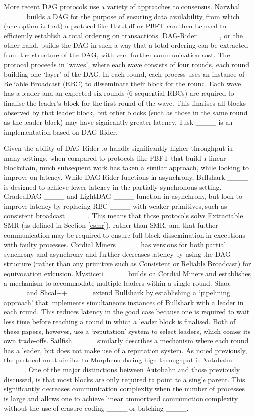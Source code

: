  \vspace{0.2cm}
 More recent DAG protocols use a variety of approaches to consensus. Narwhal ____ builds a DAG for the purpose of ensuring data availability, from which (one option is that) a protocol like Hotstuff or PBFT can then be used to efficiently establish a total ordering on transactions. DAG-Rider ____, on the other hand, builds the DAG in such a way that a total ordering can be extracted from the structure of the DAG, with zero further communication cost. The protocol proceeds in `waves', where each wave consists of four rounds, each round building one `layer' of the DAG. In each round, each process uses an instance of Reliable Broadcast (RBC) to disseminate their block for the round. Each wave has a leader and an 
 expected six rounds (6 sequential RBCs) are required to finalise
the leader's block for the first round of the wave. This finalises all blocks observed by that leader block, but other blocks (such as those in the same round as the leader block) may have signicantly greater latency. Tusk ____ is an implementation based on DAG-Rider. 

 \vspace{0.2cm} 
 Given the ability of DAG-Rider to handle significantly higher throughput in many settings, when compared to protocols like PBFT that build a linear blockchain, much subsequent work has taken a similar approach, while looking to improve on latency. While DAG-Rider functions in asynchrony, Bullshark ____ is designed to achieve lower latency in the partially synchronous setting. 
 GradedDAG ____ and LightDAG ____ function in asynchrony, but look to improve latency by replacing RBC ____ with weaker primitives, such as consistent broadcast ____. This means that those protocols solve Extractable SMR (as defined in Section \ref{esmr}), rather than SMR, and that further communication may be required to ensure full block dissemination in executions with faulty processes. Cordial Miners ____ has versions for both partial synchrony and asynchrony and further decreases latency 
by using the DAG structure (rather than any primitive such as Consistent or Reliable Broadcast) for equivocation exlcusion. Mysticeti ____ builds on Cordial Miners and establishes a mechanism to  accommodate multiple leaders within a single round. Shaol ____ and Shoal++ ____ extend Bullshark by establishing a `pipelining approach' that implements simultaneous instances of Bullshark with a leader in each round. This reduces latency in the good case because one is required to wait less time before reaching a round in which a leader block is finalised. Both of these papers, however, use a `reputation' system to select leaders, which comes its own trade-offs. Sailfish ____ similarly describes a mechanism where each round has a leader, but does not make use of a reputation system. As noted previously, the protocol most similar to Morpheus during high throughput is Autobahn ____. One of the major distinctions between Autobahn and those previously discussed, is that most blocks are only required to point to a single parent. This significantly decreases communication complexity when the number of processes is large and allows one to achieve linear ammortised communction complexity without the use of erasure coding ____ or batching ____. 

